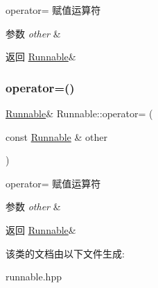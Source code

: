 operator= 赋值运算符 


\begin{DoxyParams}{参数}
{\em other} & \\
\hline
\end{DoxyParams}
\begin{DoxyReturn}{返回}
\hyperlink{classRunnable}{Runnable}\& 
\end{DoxyReturn}
\mbox{\label{classRunnable_aac70062e7bc1f55cc1695fa37d75df53}} 
\subsubsection{\texorpdfstring{operator=()}{operator=()}\hspace{0.1cm}{\footnotesize\ttfamily [2/2]}}
{\footnotesize\ttfamily \hyperlink{classRunnable}{Runnable}\& Runnable\+::operator= (\begin{DoxyParamCaption}\item[{const \hyperlink{classRunnable}{Runnable} \&}]{other }\end{DoxyParamCaption})\hspace{0.3cm}{\ttfamily [inline]}}



operator= 赋值运算符 


\begin{DoxyParams}{参数}
{\em other} & \\
\hline
\end{DoxyParams}
\begin{DoxyReturn}{返回}
\hyperlink{classRunnable}{Runnable}\& 
\end{DoxyReturn}


该类的文档由以下文件生成\+:\begin{DoxyCompactItemize}
\item 
runnable.\+hpp\end{DoxyCompactItemize}
